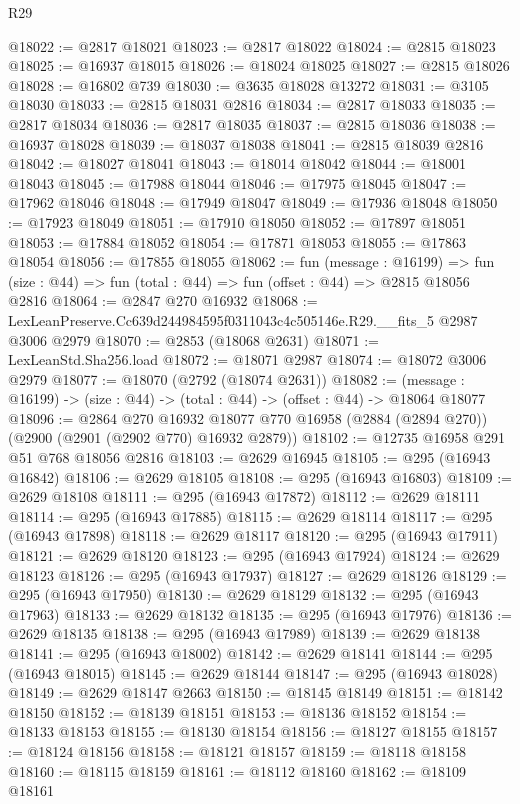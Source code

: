 \begin{lexlean}{R29}
\begin{coremodule}
@18022 := @2817 @18021
@18023 := @2817 @18022
@18024 := @2815 @18023
@18025 := @16937 @18015
@18026 := @18024 @18025
@18027 := @2815 @18026
@18028 := @16802 @739
@18030 := @3635 @18028 @13272
@18031 := @3105 @18030
@18033 := @2815 @18031 @2816
@18034 := @2817 @18033
@18035 := @2817 @18034
@18036 := @2817 @18035
@18037 := @2815 @18036
@18038 := @16937 @18028
@18039 := @18037 @18038
@18041 := @2815 @18039 @2816
@18042 := @18027 @18041
@18043 := @18014 @18042
@18044 := @18001 @18043
@18045 := @17988 @18044
@18046 := @17975 @18045
@18047 := @17962 @18046
@18048 := @17949 @18047
@18049 := @17936 @18048
@18050 := @17923 @18049
@18051 := @17910 @18050
@18052 := @17897 @18051
@18053 := @17884 @18052
@18054 := @17871 @18053
@18055 := @17863 @18054
@18056 := @17855 @18055
@18062 := fun (message : @16199) =>
  fun (size : @44) => fun (total : @44) => fun (offset : @44) => @2815 @18056 @2816
@18064 := @2847 @270 @16932
@18068 := LexLeanPreserve.Cc639d244984595f0311043c4c505146e.R29.__fits_5 @2987 @3006 @2979
@18070 := @2853 (@18068 @2631)
@18071 := LexLeanStd.Sha256.load
@18072 := @18071 @2987
@18074 := @18072 @3006 @2979
@18077 := @18070 (@2792 (@18074 @2631))
@18082 := (message : @16199) -> (size : @44) -> (total : @44) -> (offset : @44) -> @18064 @18077
@18096 := @2864
    @270
    @16932
    @18077
    @770
    @16958
    (@2884 (@2894 @270))
    (@2900 (@2901 (@2902 @770) @16932 @2879))
@18102 := @12735 @16958 @291 @51 @768 @18056 @2816
@18103 := @2629 @16945
@18105 := @295 (@16943 @16842)
@18106 := @2629 @18105
@18108 := @295 (@16943 @16803)
@18109 := @2629 @18108
@18111 := @295 (@16943 @17872)
@18112 := @2629 @18111
@18114 := @295 (@16943 @17885)
@18115 := @2629 @18114
@18117 := @295 (@16943 @17898)
@18118 := @2629 @18117
@18120 := @295 (@16943 @17911)
@18121 := @2629 @18120
@18123 := @295 (@16943 @17924)
@18124 := @2629 @18123
@18126 := @295 (@16943 @17937)
@18127 := @2629 @18126
@18129 := @295 (@16943 @17950)
@18130 := @2629 @18129
@18132 := @295 (@16943 @17963)
@18133 := @2629 @18132
@18135 := @295 (@16943 @17976)
@18136 := @2629 @18135
@18138 := @295 (@16943 @17989)
@18139 := @2629 @18138
@18141 := @295 (@16943 @18002)
@18142 := @2629 @18141
@18144 := @295 (@16943 @18015)
@18145 := @2629 @18144
@18147 := @295 (@16943 @18028)
@18149 := @2629 @18147 @2663
@18150 := @18145 @18149
@18151 := @18142 @18150
@18152 := @18139 @18151
@18153 := @18136 @18152
@18154 := @18133 @18153
@18155 := @18130 @18154
@18156 := @18127 @18155
@18157 := @18124 @18156
@18158 := @18121 @18157
@18159 := @18118 @18158
@18160 := @18115 @18159
@18161 := @18112 @18160
@18162 := @18109 @18161

\end{coremodule}
\end{lexlean}
